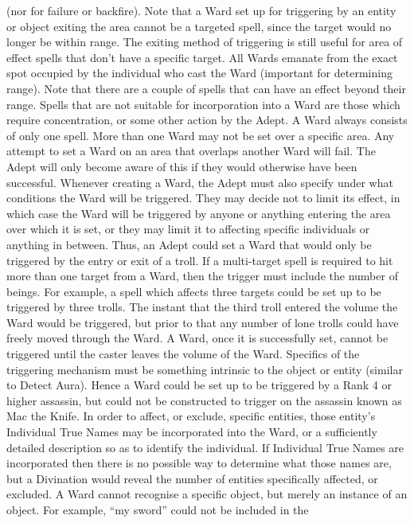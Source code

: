 \documentclass[a4paper]{article}
\begin{document}
\begin{multicols}{3}
(nor for failure or backfire). Note that a Ward set
up for triggering by an entity or object exiting the
area cannot be a targeted spell, since the target
would no longer be within range. The exiting
method of triggering is still useful for area of effect
spells that don’t have a specific target. All Wards
emanate from the exact spot occupied by the individual who cast the Ward (important for determining range). Note that there are a couple of spells
that can have an effect beyond their range.
Spells that are not suitable for incorporation into a
Ward are those which require concentration, or
some other action by the Adept. A Ward always
consists of only one spell. More than one Ward
may not be set over a specific area. Any attempt to
set a Ward on an area that overlaps another Ward
will fail. The Adept will only become aware of this
if they would otherwise have been successful.
Whenever creating a Ward, the Adept must also
specify under what conditions the Ward will be
triggered. They may decide not to limit its effect,
in which case the Ward will be triggered by anyone
or anything entering the area over which it is set, or
they may limit it to affecting specific individuals or
anything in between. Thus, an Adept could set a
Ward that would only be triggered by the entry or
exit of a troll. If a multi-target spell is required to
hit more than one target from a Ward, then the
trigger must include the number of beings. For
example, a spell which affects three targets could
be set up to be triggered by three trolls. The instant
that the third troll entered the volume the Ward
would be triggered, but prior to that any number of
lone trolls could have freely moved through the
Ward.
A Ward, once it is successfully set, cannot be triggered until the caster leaves the volume of the
Ward. Specifics of the triggering mechanism must
be something intrinsic to the object or entity (similar to Detect Aura). Hence a Ward could be set up
to be triggered by a Rank 4 or higher assassin, but
could not be constructed to trigger on the assassin
known as Mac the Knife. In order to affect, or
exclude, specific entities, those entity’s Individual
True Names may be incorporated into the Ward, or
a sufficiently detailed description so as to identify
the individual. If Individual True Names are incorporated then there is no possible way to determine
what those names are, but a Divination would
reveal the number of entities specifically affected,
or excluded. A Ward cannot recognise a specific
object, but merely an instance of an object. For
example, “my sword” could not be included in the

\end{multicols}
\end{document}

